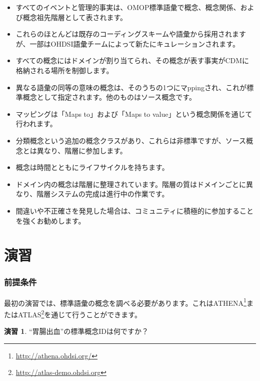 \documentclass[
  11pt]{book}
\makeatletter
\providecommand{\tightlist}{%
  \setlength{\itemsep}{0pt}\setlength{\parskip}{0pt}}
\newenvironment{kframe}{%
\medskip{}
\setlength{\fboxsep}{.8em}
 \def\at@end@of@kframe{}%
 \ifinner\ifhmode%
  \def\at@end@of@kframe{\end{minipage}}%
  \begin{minipage}{\columnwidth}%
 \fi\fi%
 \def\FrameCommand##1{\hskip\@totalleftmargin \hskip-\fboxsep
 \colorbox{myShadeColor}{##1}\hskip-\fboxsep
     \hskip-\linewidth \hskip-\@totalleftmargin \hskip\columnwidth}%
 \MakeFramed {\advance\hsize-\width
   \@totalleftmargin\z@ \linewidth\hsize
   \@setminipage}}%
 {\par\unskip\endMakeFramed%
 \at@end@of@kframe}
\newenvironment{rmdblock}[1]
  {
  \begin{itemize}
  \renewcommand{\labelitemi}{
    \raisebox{-.7\height}[0pt][0pt]{
      {\setkeys{Gin}{width=3em,keepaspectratio}\texttt{[image: images/\#1]}}
    }
  }
  \setlength{\fboxsep}{1em}
  \begin{kframe}
  \item
  }
  {
  \end{kframe}
  \end{itemize}
  }
\newenvironment{rmdsummary}
  {\begin{rmdblock}{summary}}
  {\end{rmdblock}}
\theoremstyle{definition}
\theoremstyle{definition}
\theoremstyle{definition}
\newtheorem{exercise}{演習}[chapter]
\theoremstyle{definition}
\theoremstyle{remark}
\makeatother
\begin{document}
\begin{rmdsummary}
\begin{itemize}
\tightlist
\item
  すべてのイベントと管理的事実は、OMOP標準語彙で概念、概念関係、および概念祖先階層として表されます。
\item
  これらのほとんどは既存のコーディングスキームや語彙から採用されますが、一部はOHDSI語彙チームによって新たにキュレーションされます。
\item
  すべての概念にはドメインが割り当てられ、その概念が表す事実がCDMに格納される場所を制御します。
\item
  異なる語彙の同等の意味の概念は、そのうちの1つにマppingされ、これが標準概念として指定されます。他のものはソース概念です。
\item
  マッピングは「Maps to」および「Maps to value」という概念関係を通じて行われます。
\item
  分類概念という追加の概念クラスがあり、これらは非標準ですが、ソース概念とは異なり、階層に参加します。
\item
  概念は時間とともにライフサイクルを持ちます。
\item
  ドメイン内の概念は階層に整理されています。階層の質はドメインごとに異なり、階層システムの完成は進行中の作業です。
\item
  間違いや不正確さを発見した場合は、コミュニティに積極的に参加することを強くお勧めします。
\end{itemize}
\end{rmdsummary}

\section{演習}\label{ux6f14ux7fd2}

\subsubsection*{前提条件}\label{ux524dux63d0ux6761ux4ef6-2}

最初の演習では、標準語彙の概念を調べる必要があります。これはATHENA\footnote{\url{http://athena.ohdsi.org/}}またはATLAS\footnote{\url{http://atlas-demo.ohdsi.org}}を通じて行うことができます。

\begin{exercise}
\protect\hypertarget{exr:exerciseVocab1}{}\label{exr:exerciseVocab1}``胃腸出血''の標準概念IDは何ですか？
\end{exercise}
\end{document}
